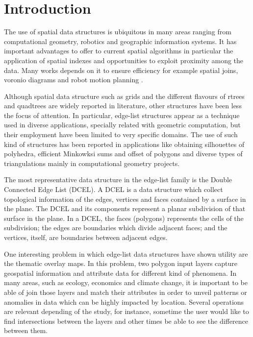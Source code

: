 \section{Introduction}
The use of spatial data structures is ubiquitous in many areas ranging from computational geometry, robotics and geographic information systems.  It has important advantages to offer to current spatial algorithms in particular the application of spatial indexes and opportunities to exploit proximity among the data.  Many works depends on it to ensure efficiency for example spatial joins, voronio diagrams and robot motion planning \cite{berg_computational_2008}.

Although spatial data structure such as grids and the different flavours of rtrees and quadtrees are widely reported in literature, other structures have been less the focus of attention.  In particular, edge-list structures appear as a technique used in diverse applications, specially related with geometric computation, but their employment have been limited to very specific domains.  The use of such kind of structures has been reported in applications like obtaining silhouettes of polyhedra, efficient Minkowksi sums and offset of polygons and diverse types of triangulations mainly in computational geometry projects.

The most representative data structure in the edge-list family is the Double Connected Edge List (DCEL).  A DCEL \cite{muller_finding_1978, preparata_computational_1985} is a data structure which collect topological information of the edges, vertices and faces contained by a surface in the plane.  The DCEL and its components represent a planar subdivision of that surface in the plane. In a DCEL, the faces (polygons) represents the cells of the subdivision; the edges are boundaries which divide adjacent faces; and the vertices, itself, are boundaries between adjacent edges.

One interesting problem in which edge-list data structures have shown utility are the thematic overlay maps. In this problem, two polygon input layers capture geospatial information and attribute data for different kind of phenomena.  In many areas, such as ecology, economics and climate change, it is important to be able of join those layers and match their attributes in order to unveil patterns or anomalies in data which can be highly impacted by location.  Several operations are relevant depending of the study, for instance, sometime the user would like to find intersections between the layers and other times be able to see the difference between them. 

